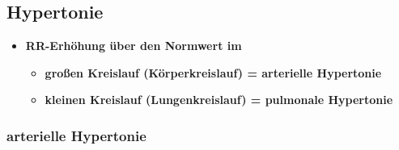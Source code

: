 \subsection{Hypertonie}
	\begin{itemize}
		\item \textbf{RR-Erhöhung über den Normwert im}
			\begin{itemize}
				\item \textbf{großen Kreislauf (Körperkreislauf) = arterielle Hypertonie}
				\item \textbf{kleinen Kreislauf (Lungenkreislauf) = pulmonale Hypertonie}
			\end{itemize}
	\end{itemize}
	\subsubsection{arterielle Hypertonie}
